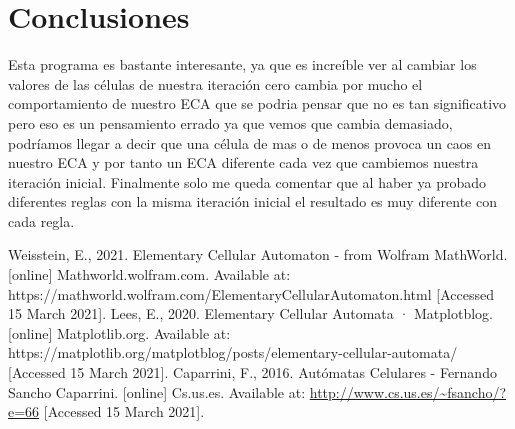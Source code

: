 \documentclass[11pt]{article}
\begin{document}
	\section{Conclusiones}
	Esta programa es bastante interesante, ya que es increíble ver al cambiar los valores de las células de nuestra iteración cero cambia por mucho el comportamiento de nuestro ECA que se podria pensar que no es tan significativo pero eso es un pensamiento errado ya que vemos 	que cambia demasiado, podríamos llegar a decir que una célula de mas o de menos provoca un caos en nuestro ECA y por tanto un ECA diferente cada vez que cambiemos nuestra iteración inicial. Finalmente solo me queda comentar que al haber ya probado diferentes reglas con la misma iteración inicial el resultado es muy diferente con cada regla.
	\begin{thebibliography}{1}
  Weisstein, E., 2021. Elementary Cellular Automaton - from Wolfram MathWorld. [online] Mathworld.wolfram.com. Available at: https://mathworld.wolfram.com/ElementaryCellularAutomaton.html [Accessed 15 March 2021].	
  Lees, E., 2020. Elementary Cellular Automata · Matplotblog. [online] Matplotlib.org. Available at: https://matplotlib.org/matplotblog/posts/elementary-cellular-automata/ [Accessed 15 March 2021].
   Caparrini, F., 2016. Autómatas Celulares - Fernando Sancho Caparrini. [online] Cs.us.es. Available at: \url{http://www.cs.us.es/~fsancho/?e=66} [Accessed 15 March 2021].
\end{thebibliography}
\end{document}
